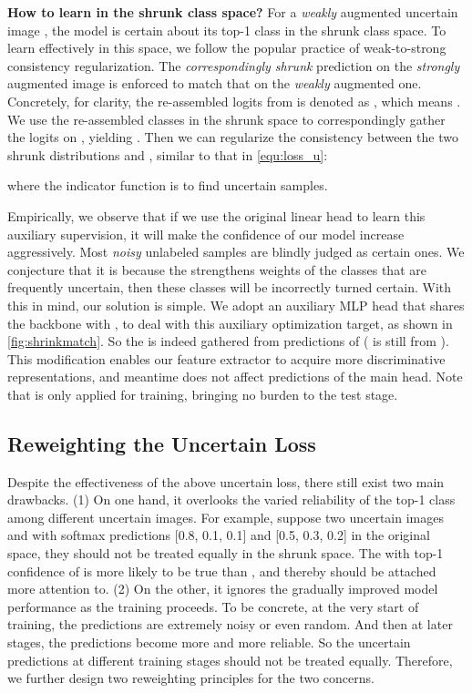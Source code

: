 \documentclass[10pt,twocolumn,letterpaper]{article}
\begin{document}
\vspace{1mm}
\noindent
\textbf{How to learn in the shrunk class space?} For a \emph{weakly} augmented uncertain image , the model is certain about its top-1 class in the shrunk class space. To learn effectively in this space, we follow the popular practice of weak-to-strong consistency regularization. The \emph{correspondingly shrunk} prediction on the \emph{strongly} augmented image is enforced to match that on the \emph{weakly} augmented one. Concretely, for clarity, the re-assembled logits from  is denoted as , which means . We use the re-assembled classes  in the shrunk space to correspondingly gather the logits  on , yielding . Then we can regularize the consistency between the two shrunk distributions  and , similar to that in \cref{equ:loss_u}:

where the indicator function is to find uncertain samples.


Empirically, we observe that if we use the original linear head  to learn this auxiliary supervision, it will make the confidence of our model increase aggressively. Most \emph{noisy} unlabeled samples are blindly judged as certain ones. We conjecture that it is because the  strengthens weights of the classes that are frequently uncertain, then these classes will be incorrectly turned certain. With this in mind, our solution is simple. We adopt an auxiliary MLP head  that shares the backbone with , to deal with this auxiliary optimization target, as shown in \cref{fig:shrinkmatch}. So the  is indeed gathered from predictions of  ( is still from ). This modification enables our feature extractor to acquire more discriminative representations, and meantime does not affect predictions of the main head. Note that  is only applied for training, bringing no burden to the test stage.

\subsection{\label{sec:reweight}Reweighting the Uncertain Loss}

Despite the effectiveness of the above uncertain loss, there still exist two main drawbacks. (1) On one hand, it overlooks the varied reliability of the top-1 class among different uncertain images. For example, suppose two uncertain images  and  with softmax predictions [0.8, 0.1, 0.1] and [0.5, 0.3, 0.2] in the original space, they should not be treated equally in the shrunk space. The  with top-1 confidence of  is more likely to be true than , and thereby should be attached more attention to. (2) On the other, it ignores the gradually improved model performance as the training proceeds. To be concrete, at the very start of training, the predictions are extremely noisy or even random. And then at later stages, the predictions become more and more reliable. So the uncertain predictions at different training stages should not be treated equally. Therefore, we further design two reweighting principles for the two concerns.
\end{document}
